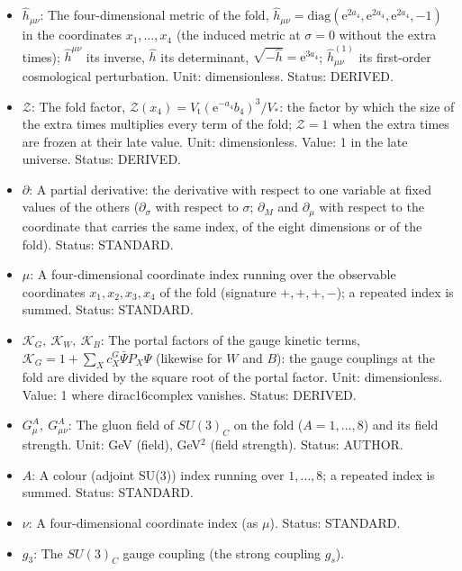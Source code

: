 \documentclass[
  10pt,
]{article}
\providecommand{\tightlist}{%
  \setlength{\itemsep}{0pt}\setlength{\parskip}{0pt}}
\begin{document}
\begin{itemize}
\tightlist
\item
  \(\hat h_{\mu\nu}\): The four-dimensional metric of the fold,
  \(\hat h_{\mu\nu} = \mathrm{diag}(\mathrm{e}^{2a_4}, \mathrm{e}^{2a_4}, \mathrm{e}^{2a_4}, -1)\)
  in the coordinates \(x_1, \dots, x_4\) (the induced metric at
  \(\sigma = 0\) without the extra times); \(\hat h^{\mu\nu}\) its
  inverse, \(\hat h\) its determinant,
  \(\sqrt{-\hat h} = \mathrm{e}^{3a_4}\); \(\hat h^{(1)}_{\mu\nu}\) its
  first-order cosmological perturbation. Unit: dimensionless. Status:
  DERIVED.
\item
  \(\mathcal{Z}\): The fold factor,
  \(\mathcal{Z}(x_4) = V_{\mathrm{t}}(\mathrm{e}^{-a_4}b_4)^3/V_*\): the
  factor by which the size of the extra times multiplies every term of
  the fold; \(\mathcal{Z} = 1\) when the extra times are frozen at their
  late value. Unit: dimensionless. Value: 1 in the late universe.
  Status: DERIVED.
\item
  \(\partial\): A partial derivative: the derivative with respect to one
  variable at fixed values of the others (\(\partial_\sigma\) with
  respect to \(\sigma\); \(\partial_M\) and \(\partial_\mu\) with
  respect to the coordinate that carries the same index, of the eight
  dimensions or of the fold). Status: STANDARD.
\item
  \(\mu\): A four-dimensional coordinate index running over the
  observable coordinates \(x_1, x_2, x_3, x_4\) of the fold (signature
  \(+,+,+,-\)); a repeated index is summed. Status: STANDARD.
\item
  \(\mathcal{K}_{G},\ \mathcal{K}_{W},\ \mathcal{K}_{B}\): The portal
  factors of the gauge kinetic terms,
  \(\mathcal{K}_{G} = 1 + \sum_Xc^{G}_X\bar\Psi P_X\Psi\) (likewise for
  \(W\) and \(B\)): the gauge couplings at the fold are divided by the
  square root of the portal factor. Unit: dimensionless. Value: 1 where
  dirac16complex vanishes. Status: DERIVED.
\item
  \(G^A_\mu,\ G^A_{\mu\nu}\): The gluon field of \(SU(3)_C\) on the fold
  (\(A = 1, \dots, 8\)) and its field strength. Unit: GeV (field),
  GeV\(^2\) (field strength). Status: AUTHOR.
\item
  \(A\): A colour (adjoint SU(3)) index running over \(1, \dots, 8\); a
  repeated index is summed. Status: STANDARD.
\item
  \(\nu\): A four-dimensional coordinate index (as \(\mu\)). Status:
  STANDARD.
\item
  \(g_3\): The \(SU(3)_C\) gauge coupling (the strong coupling \(g_s\)).

\end{itemize}
\end{document}
